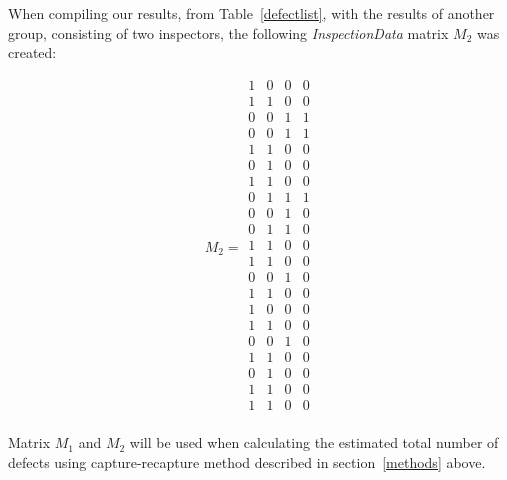 \noindent When compiling our results, from Table~\ref{defectlist}, with the results of another group, consisting of two inspectors, the following \textit{InspectionData} matrix $M_{2}$ was created:

\[
M_{2} =
\begin{array}{cccc}
 1 & 0 & 0 & 0 \\
 1 & 1 & 0 & 0 \\
 0 & 0 & 1 & 1 \\
 0 & 0 & 1 & 1 \\
 1 & 1 & 0 & 0 \\
 0 & 1 & 0 & 0 \\
 1 & 1 & 0 & 0 \\
 0 & 1 & 1 & 1 \\
 0 & 0 & 1 & 0 \\
 0 & 1 & 1 & 0 \\
 1 & 1 & 0 & 0 \\
 1 & 1 & 0 & 0 \\
 0 & 0 & 1 & 0 \\
 1 & 1 & 0 & 0 \\
 1 & 0 & 0 & 0 \\
 1 & 1 & 0 & 0 \\
 0 & 0 & 1 & 0 \\
 1 & 1 & 0 & 0 \\
 0 & 1 & 0 & 0 \\
 1 & 1 & 0 & 0 \\
 1 & 1 & 0 & 0 \\
\end{array}
\]

Matrix $M_{1}$ and $M_{2}$ will be used when calculating the estimated total number of defects using capture-recapture method described in section~\ref{methods} above. 